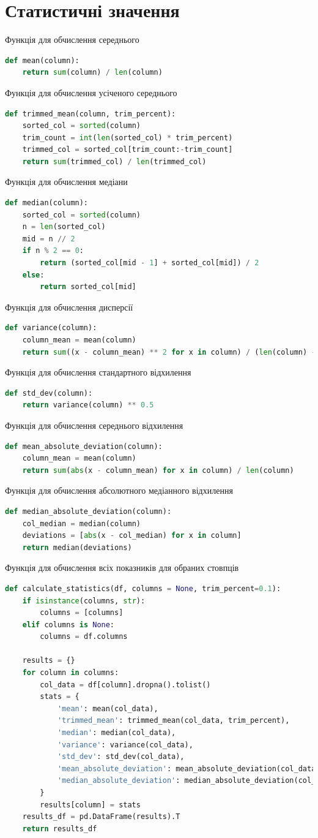 \documentclass{article}
\begin{document}
\section{Статистичні значення}
Функція для обчислення середнього
\begin{lstlisting}[language=Python]
def mean(column):
    return sum(column) / len(column)
\end{lstlisting}
Функція для обчислення усіченого середнього
\begin{lstlisting}[language=Python]
def trimmed_mean(column, trim_percent):
    sorted_col = sorted(column)
    trim_count = int(len(sorted_col) * trim_percent)
    trimmed_col = sorted_col[trim_count:-trim_count]
    return sum(trimmed_col) / len(trimmed_col)
\end{lstlisting}
Функція для обчислення медіани
\begin{lstlisting}[language=Python]
def median(column):
    sorted_col = sorted(column)
    n = len(sorted_col)
    mid = n // 2
    if n % 2 == 0:
        return (sorted_col[mid - 1] + sorted_col[mid]) / 2
    else:
        return sorted_col[mid]
\end{lstlisting}
Функція для обчислення дисперсії
\begin{lstlisting}[language=Python]
def variance(column):
    column_mean = mean(column)
    return sum((x - column_mean) ** 2 for x in column) / (len(column) - 1)
\end{lstlisting}
Функція для обчислення стандартного відхилення
\begin{lstlisting}[language=Python]
def std_dev(column):
    return variance(column) ** 0.5
\end{lstlisting}
Функція для обчислення середнього відхилення
\begin{lstlisting}[language=Python]
def mean_absolute_deviation(column):
    column_mean = mean(column)
    return sum(abs(x - column_mean) for x in column) / len(column)
\end{lstlisting}
Функція для обчислення абсолютного медіанного відхилення
\begin{lstlisting}[language=Python]
def median_absolute_deviation(column):
    col_median = median(column)
    deviations = [abs(x - col_median) for x in column]
    return median(deviations)
\end{lstlisting}
Функція для обчислення всіх показників для обраних стовпців
\begin{lstlisting}[language=Python]
def calculate_statistics(df, columns = None, trim_percent=0.1):
    if isinstance(columns, str):
        columns = [columns]
    elif columns is None:
        columns = df.columns

    results = {}
    for column in columns:
        col_data = df[column].dropna().tolist() 
        stats = {
            'mean': mean(col_data),
            'trimmed_mean': trimmed_mean(col_data, trim_percent),
            'median': median(col_data),
            'variance': variance(col_data),
            'std_dev': std_dev(col_data),
            'mean_absolute_deviation': mean_absolute_deviation(col_data),
            'median_absolute_deviation': median_absolute_deviation(col_data)
        }
        results[column] = stats
    results_df = pd.DataFrame(results).T
    return results_df
\end{lstlisting}
\end{document}
